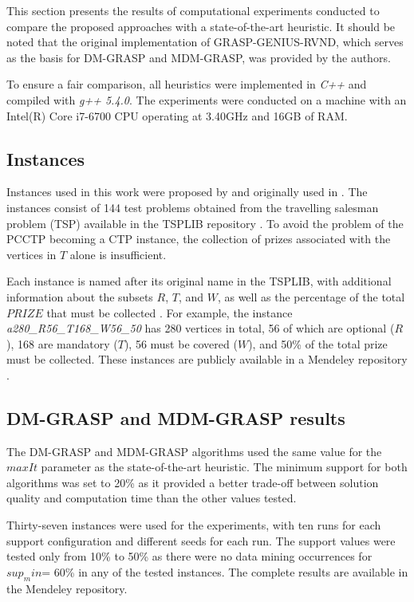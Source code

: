 \documentclass{singlecol-new}
\begin{document}
\label{sec:computationalresults}

This section presents the results of computational experiments conducted to compare the proposed approaches with a state-of-the-art heuristic. It should be noted that the original implementation of GRASP-GENIUS-RVND, which serves as the basis for DM-GRASP and MDM-GRASP, was provided by the authors.

To ensure a fair comparison, all heuristics were implemented in \textit{C++} and compiled with \textit{g++ 5.4.0}. The experiments were conducted on a machine with an Intel(R) Core i7-6700 CPU operating at 3.40GHz and 16GB of RAM.


\subsection{Instances}

Instances used in this work were proposed by \citet{silva2009problema} and originally used in \citet{daSilva}. The instances consist of 144 test problems obtained from the travelling salesman problem (TSP) available in the TSPLIB repository \citep{reinelt1991tsplib}. To avoid the problem of the PCCTP becoming a CTP instance, the collection of prizes associated with the vertices in $T$ alone is insufficient.

Each instance is named after its original name in the TSPLIB, with additional information about the subsets $R$, $T$, and $W$, as well as the percentage of the total $PRIZE$ that must be collected \citep{silva2009problema}. For example, the instance \textit{a280\_R56\_T168\_W56\_50} has 280 vertices in total, 56 of which are optional ($R$), 168 are mandatory ($T$), 56 must be covered ($W$), and 50\% of the total prize must be collected. These instances are publicly available in a Mendeley repository \citep{pcctspMendely}.

\subsection{DM-GRASP and MDM-GRASP results}

The DM-GRASP and MDM-GRASP algorithms used the same value for the $maxIt$ parameter as the state-of-the-art heuristic. The minimum support for both algorithms was set to 20\% as it provided a better trade-off between solution quality and computation time than the other values tested. 


Thirty-seven instances were used for the experiments, with ten runs for each support configuration and different seeds for each run. The support values were tested only from 10\% to 50\% as there were no data mining occurrences for $sup_min$= 60\% in any of the tested instances. The complete results are available in the Mendeley repository.
\end{document}
